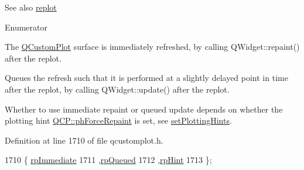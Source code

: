 \begin{DoxySeeAlso}{See also}
\hyperlink{class_q_custom_plot_a606fd384b2a637ce2c24899bcbde77d6}{replot} 
\end{DoxySeeAlso}
\begin{Desc}
\item[Enumerator]\par
\begin{description}
\item[{\em 
\hypertarget{class_q_custom_plot_a45d61392d13042e712a956d27762aa39a0d4831572370d871f2b7cb88806bac59}{}rp\+Immediate\label{class_q_custom_plot_a45d61392d13042e712a956d27762aa39a0d4831572370d871f2b7cb88806bac59}
}]The \hyperlink{class_q_custom_plot}{Q\+Custom\+Plot} surface is immediately refreshed, by calling Q\+Widget\+::repaint() after the replot. \item[{\em 
\hypertarget{class_q_custom_plot_a45d61392d13042e712a956d27762aa39aaaae083a19bc668597bf0f86e000f798}{}rp\+Queued\label{class_q_custom_plot_a45d61392d13042e712a956d27762aa39aaaae083a19bc668597bf0f86e000f798}
}]Queues the refresh such that it is performed at a slightly delayed point in time after the replot, by calling Q\+Widget\+::update() after the replot. \item[{\em 
\hypertarget{class_q_custom_plot_a45d61392d13042e712a956d27762aa39adfa1f2387617168d9299f4c8ad15b332}{}rp\+Hint\label{class_q_custom_plot_a45d61392d13042e712a956d27762aa39adfa1f2387617168d9299f4c8ad15b332}
}]Whether to use immediate repaint or queued update depends on whether the plotting hint \hyperlink{namespace_q_c_p_a5400e5fcb9528d92002ddb938c1f4ef4aa3090dafa0e0f9a28c579c79d6c2d283}{Q\+C\+P\+::ph\+Force\+Repaint} is set, see \hyperlink{class_q_custom_plot_a94a33cbdadbbac5934843508bcfc210d}{set\+Plotting\+Hints}. \end{description}
\end{Desc}


Definition at line 1710 of file qcustomplot.\+h.


\begin{DoxyCode}
1710                        \{ \hyperlink{class_q_custom_plot_a45d61392d13042e712a956d27762aa39a0d4831572370d871f2b7cb88806bac59}{rpImmediate} 
1711                          ,\hyperlink{class_q_custom_plot_a45d61392d13042e712a956d27762aa39aaaae083a19bc668597bf0f86e000f798}{rpQueued}   
1712                          ,\hyperlink{class_q_custom_plot_a45d61392d13042e712a956d27762aa39adfa1f2387617168d9299f4c8ad15b332}{rpHint}     
1713                        \};
\end{DoxyCode}



